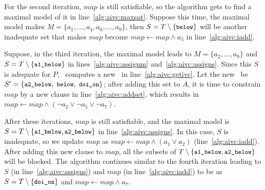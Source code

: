 For the second iteration, $map$ is still satisfiable,
so the algorithm gets to find a maximal model of it in line~\ref{alg:aivc:maxsat}. Suppose this time, the maximal model makes $M = \{a_1, \ldots, a_4, a_6, \ldots, a_9\}$, then $S = T \setminus \{ {\small \texttt{below}}\} $ will be another inadequate set that makes $map$ become
$map \leftarrow map \wedge a_5$
in line~\ref{alg:aivc:iadd}.

Suppose, in the third iteration, the maximal model leads to $M = \{a_2, \ldots, a_9\}$ and
$S = T \setminus \{ {\small \texttt{a1\_below}}\} $ in lines~\ref{alg:aivc:assignm} and~\ref{alg:aivc:assigns}.
Since this $S$ is adequate for $P$, \getivc ~computes a new \mivc\ in line~\ref{alg:aivc:getivc}.
Let the new \mivc\ be $S' = \{ {\small \texttt{a2\_below},~\texttt{below}, ~\texttt{doi\_on}}\}$; after adding this set to $A$,
it is time to constrain $map$ by a new clause in line~\ref{alg:aivc:addset},
which results in $map \leftarrow map \wedge (\neg a_2 \vee \neg a_5 \vee \neg a_7)$.

After these iterations, $map$ is still satisfiable, and the maximal model is
 $S = T \setminus \{ { \small \texttt{a1\_below}}, { \small \texttt{a2\_below}}\}$ in line~\ref{alg:aivc:assigns}.
In this case, $S$ is inadequate, so we update $map$ as
$map \leftarrow map \wedge (a_1 \vee a_2)$ (line~\ref{alg:aivc:iadd}). After adding this new clause to $map$,
all the subsets of $T \setminus \{ { \small \texttt{a1\_below}}, {\small \texttt{a2\_below}}\}$
will be blocked. The algorithm continues similar to the fourth iteration leading to $S$ (in line~\ref{alg:aivc:assigns}) and $map$ (in line~\ref{alg:aivc:iadd}) to be as
 $S = T \setminus \{ {\small  \texttt{doi\_on}}\}$ and $map \leftarrow map \wedge a_7$.

